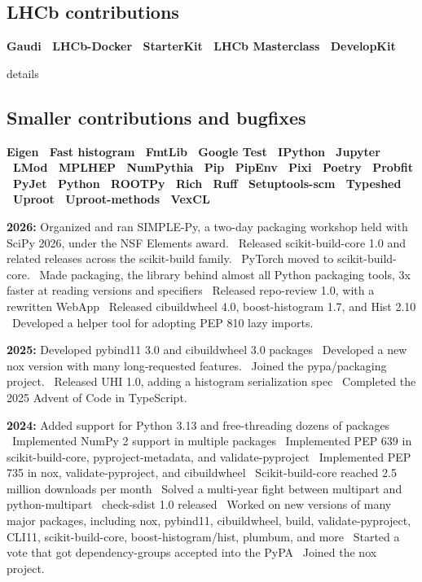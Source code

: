 \documentclass[10pt,letterpaper]{moderncv}
\begin{document}
\subsection{LHCb contributions}
\textbf{%
    Gaudi \textbullet\
    LHCb-Docker \textbullet\
    StarterKit \textbullet\
    LHCb Masterclass \textbullet\
    DevelopKit
}


\begin{taggedblock}{details}
\subsection{Smaller contributions and bugfixes}
\textbf{%
    Eigen \textbullet\
    Fast histogram \textbullet\
    FmtLib \textbullet\
    Google Test \textbullet\
    IPython \textbullet\
    Jupyter \textbullet\
    LMod \textbullet\
    MPLHEP \textbullet\
    NumPythia \textbullet\
    Pip \textbullet\
    PipEnv \textbullet\
    Pixi \textbullet\
    Poetry \textbullet\
    Probfit \textbullet\
    PyJet \textbullet\
    Python \textbullet\
    ROOTPy \textbullet\
    Rich \textbullet\
    Ruff \textbullet\
    Setuptools-scm \textbullet\
    Typeshed \textbullet\
    Uproot \textbullet\
    Uproot-methods \textbullet\
    VexCL
}
\end{taggedblock}



\textbf{2026:}
Organized and ran SIMPLE-Py, a two-day packaging workshop held with SciPy 2026, under the NSF Elements award. \textbullet\
Released scikit-build-core 1.0 and related releases across the scikit-build family. \textbullet\
PyTorch moved to scikit-build-core. \textbullet\
Made packaging, the library behind almost all Python packaging tools, 3x faster at reading versions and specifiers \textbullet\
Released repo-review 1.0, with a rewritten WebApp \textbullet\
Released cibuildwheel 4.0, boost-histogram 1.7, and Hist 2.10 \textbullet\
Developed a helper tool for adopting PEP 810 lazy imports.


\textbf{2025:}
Developed pybind11 3.0 and cibuildwheel 3.0 packages \textbullet\
Developed a new nox version with many long-requested features. \textbullet\
Joined the pypa/packaging project. \textbullet\
Released UHI 1.0, adding a histogram serialization spec \textbullet\
Completed the 2025 Advent of Code in TypeScript.


\textbf{2024:}
Added support for Python 3.13 and free-threading dozens of packages \textbullet\
Implemented NumPy 2 support in multiple packages \textbullet\
Implemented PEP 639 in scikit-build-core, pyproject-metadata, and validate-pyproject \textbullet\
Implemented PEP 735 in nox, validate-pyproject, and cibuildwheel \textbullet\
Scikit-build-core reached 2.5 million downloads per month \textbullet\
Solved a multi-year fight between multipart and python-multipart \textbullet\
check-sdist 1.0 released \textbullet\
Worked on new versions of many major packages, including nox, pybind11,
cibuildwheel, build, validate-pyproject, CLI11, scikit-build-core, boost-histogram/hist,
plumbum, and more \textbullet\
Started a vote that got dependency-groups accepted into the PyPA \textbullet\
Joined the nox project.
\end{document}
